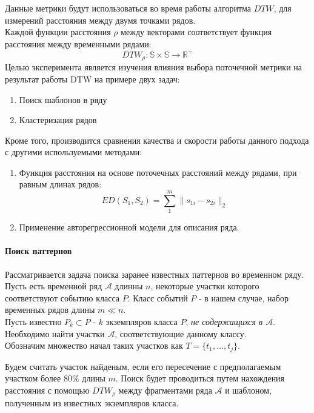 \documentclass[12pt,twoside]{article}
\begin{document}
        Данные метрики будут использоваться во время работы алгоритма $DTW$, для измерений расстояния между двумя точками рядов. \\
        Каждой функции расстояния $\rho$ между векторами соответствует функция расстояния между временными рядами:
        $$
            DTW_{\rho}: \mathbb{S} \times \mathbb{S} \rightarrow \mathbb{R}^+ 
        $$
        Целью эксперимента является изучения влияния выбора поточечной метрики на результат работы DTW на примере двух задач:

        \begin{enumerate}
            \item Поиск шаблонов в ряду
            \item Кластеризация рядов
        \end{enumerate}
        
        Кроме того, производится сравнения качества и скорости работы данного подхода с другими используемыми методами:
        \begin{enumerate}
            \item Функция расстояния на основе поточечных расстояний между рядами, при равным длинах рядов:
                $$
                    ED(S_1, S_2) = \sum\limits_1^m \|s_{1i} - s_{2i}\|_2
                $$

            \item Применение авторегрессионной модели для описания ряда.
        \end{enumerate}

        \paragraph{Поиск паттернов}
        
        Рассматривается задача поиска заранее известных паттернов во временном ряду. 
        Пусть есть временной ряд $\mathcal{A}$ длинны $n$, некоторые участки которого соответствуют событию класса $P$.
        Класс событий $P$ \-- в нашем случае, набор временных рядов длины $m \ll n$. \\
        Пусть известно $P_k \subset P$ \-- $k$ экземпляров класса $P$, \textit{не содержащихся в $\mathcal{A}$}. \\
        Необходимо найти участки $\mathcal{A}$, соответствующие данному классу. \\
        Обозначим множество начал таких участков как $T = \{t_1, \dots, t_j \}$.

        Будем считать участок найденым, если его пересечение с предполагаемым участком более $80\%$ длины $m$.
        Поиск будет проводиться путем нахождения расстояния с помощью $DTW_{\rho}$ между фрагментами ряда $\mathcal{A}$ и шаблоном,
            полученным из известных экземпляров класса. 
\end{document}
